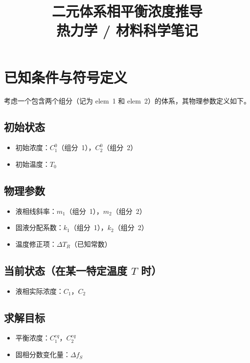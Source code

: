 \documentclass[12pt, a4paper]{article}
\title{\textbf{二元体系相平衡浓度推导}\\[0.5em]
\large 热力学 / 材料科学笔记}
\author{}
\date{}
\begin{document}
\maketitle
\tableofcontents
\newpage

\section{已知条件与符号定义}

考虑一个包含两个组分（记为 elem~1 和 elem~2）的体系，其物理参数定义如下。

\subsection*{初始状态}
\begin{itemize}
  \item 初始浓度：$C_1^0$（组分~1），$C_2^0$（组分~2）
  \item 初始温度：$T_0$
\end{itemize}

\subsection*{物理参数}
\begin{itemize}
  \item 液相线斜率：$m_1$（组分~1），$m_2$（组分~2）
  \item 固液分配系数：$k_1$（组分~1），$k_2$（组分~2）
  \item 温度修正项：$\Delta T_R$（已知常数）
\end{itemize}

\subsection*{当前状态（在某一特定温度 $T$ 时）}
\begin{itemize}
  \item 液相实际浓度：$C_1$，$C_2$
\end{itemize}

\subsection*{求解目标}
\begin{itemize}
  \item 平衡浓度：$C_1^{eq}$，$C_2^{eq}$
  \item 固相分数变化量：$\Delta f_S$
\end{itemize}
\end{document}
